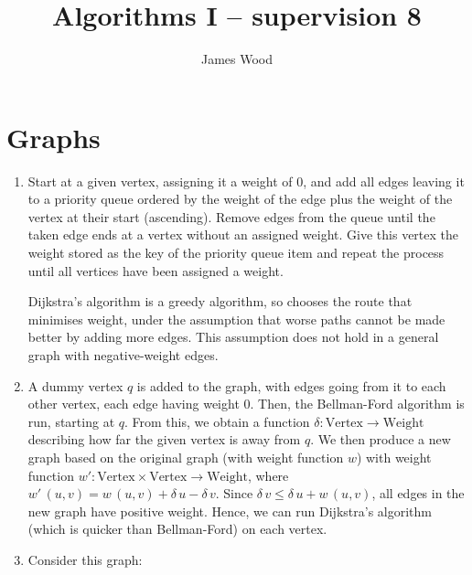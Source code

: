 \documentclass[11pt]{article}
\title{\textbf{Algorithms I -- supervision 8}}
\author{James Wood}
\begin{document}
\renewcommand{\labelenumi}{(\alph{enumi})}
\renewcommand{\labelenumii}{(\roman{enumii})}

\maketitle

\section{Graphs}
\begin{enumerate}
\item
  Start at a given vertex, assigning it a weight of 0, and add all edges leaving it to a priority queue ordered by the weight of the edge plus the weight of the vertex at their start (ascending). Remove edges from the queue until the taken edge ends at a vertex without an assigned weight. Give this vertex the weight stored as the key of the priority queue item and repeat the process until all vertices have been assigned a weight.

  Dijkstra's algorithm is a greedy algorithm, so chooses the route that minimises weight, under the assumption that worse paths cannot be made better by adding more edges. This assumption does not hold in a general graph with negative-weight edges.
\item
  A dummy vertex \(q\) is added to the graph, with edges going from it to each other vertex, each edge having weight 0. Then, the Bellman-Ford algorithm is run, starting at \(q\). From this, we obtain a function \(\delta:\mathrm{Vertex}\to\mathrm{Weight}\) describing how far the given vertex is away from \(q\). We then produce a new graph based on the original graph (with weight function \(w\)) with weight function \(w':\mathrm{Vertex}\times\mathrm{Vertex}\to\mathrm{Weight}\), where \(w'\,(u,v)=w\,(u,v)+\delta\,u-\delta\,v\). Since \(\delta\,v\leq\delta\,u+w\,(u,v)\), all edges in the new graph have positive weight. Hence, we can run Dijkstra's algorithm (which is quicker than Bellman-Ford) on each vertex.
\item
  Consider this graph:



\end{enumerate}
\end{document}
